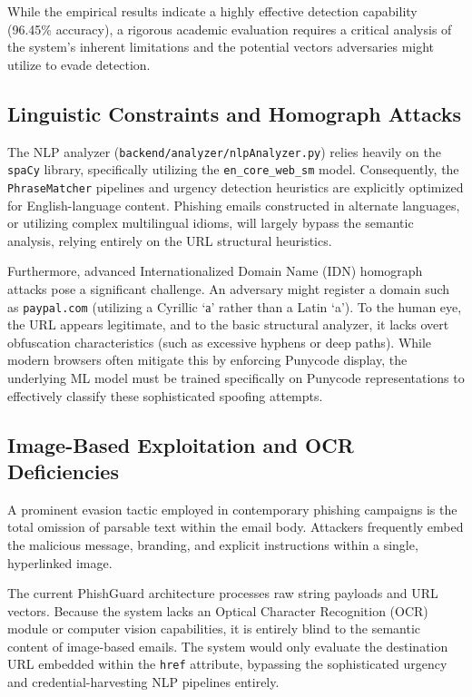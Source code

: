 While the empirical results indicate a highly effective detection
capability (96.45\% accuracy), a rigorous academic evaluation requires a
critical analysis of the system's inherent limitations and the potential
vectors adversaries might utilize to evade detection.

\subsection{Linguistic Constraints and Homograph
Attacks}\label{linguistic-constraints-and-homograph-attacks}

The NLP analyzer (\texttt{backend/analyzer/nlpAnalyzer.py}) relies
heavily on the \texttt{spaCy} library, specifically utilizing the
\texttt{en\_core\_web\_sm} model. Consequently, the
\texttt{PhraseMatcher} pipelines and urgency detection heuristics are
explicitly optimized for English-language content. Phishing emails
constructed in alternate languages, or utilizing complex multilingual
idioms, will largely bypass the semantic analysis, relying entirely on
the URL structural heuristics.

Furthermore, advanced Internationalized Domain Name (IDN) homograph
attacks pose a significant challenge. An adversary might register a
domain such as \texttt{pаypal.com} (utilizing a Cyrillic `а' rather than
a Latin `a'). To the human eye, the URL appears legitimate, and to the
basic structural analyzer, it lacks overt obfuscation characteristics
(such as excessive hyphens or deep paths). While modern browsers often
mitigate this by enforcing Punycode display, the underlying ML model
must be trained specifically on Punycode representations to effectively
classify these sophisticated spoofing attempts.

\subsection{Image-Based Exploitation and OCR
Deficiencies}\label{image-based-exploitation-and-ocr-deficiencies}

A prominent evasion tactic employed in contemporary phishing campaigns
is the total omission of parsable text within the email body. Attackers
frequently embed the malicious message, branding, and explicit
instructions within a single, hyperlinked image.

The current PhishGuard architecture processes raw string payloads and
URL vectors. Because the system lacks an Optical Character Recognition
(OCR) module or computer vision capabilities, it is entirely blind to
the semantic content of image-based emails. The system would only
evaluate the destination URL embedded within the \texttt{href}
attribute, bypassing the sophisticated urgency and credential-harvesting
NLP pipelines entirely.

